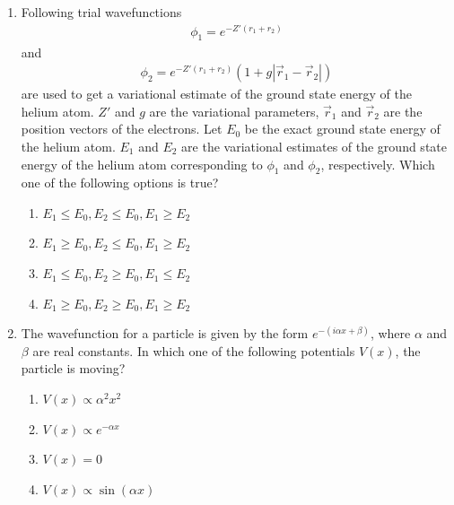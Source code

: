 \documentclass[journal,12pt,onecolumn]{IEEEtran}
\theoremstyle{remark}
\begin{document}
\begin{enumerate}
\item Following trial wavefunctions
\begin{align*}
\phi_1 = e^{-Z'(r_1 + r_2)}
\end{align*}
and
\begin{align*}
    \phi_2 = e^{-Z'(r_1 + r_2)}(1 + g|\vec{r}_1 - \vec{r}_2|)
\end{align*}
are used to get a variational estimate of the ground state energy of the helium atom. $Z'$ and $g$ are the variational parameters, $\vec{r}_1$ and $\vec{r}_2$ are the position vectors of the electrons. Let $E_0$ be the exact ground state energy of the helium atom. $E_1$ and $E_2$ are the variational estimates of the ground state energy of the helium atom corresponding to $\phi_1$ and $\phi_2$, respectively. Which one of the following options is true?
\begin{enumerate}
    \item $E_1 \leq E_0, E_2 \leq E_0, E_1 \geq E_2$
    \item $E_1 \geq E_0, E_2 \leq E_0, E_1 \geq E_2$
    \item $E_1 \leq E_0, E_2 \geq E_0, E_1 \leq E_2$
    \item $E_1 \geq E_0, E_2 \geq E_0, E_1 \geq E_2$
\end{enumerate}
\item The wavefunction for a particle is given by the form $e^{-(i \alpha x + \beta)}$, where $\alpha$ and $\beta$ are real constants. In which one of the following potentials $V(x)$, the particle is moving?
\begin{enumerate}
    \item $V(x) \propto \alpha^2 x^2$
    \item $V(x) \propto e^{-\alpha x}$
    \item $V(x) = 0$
    \item $V(x) \propto \sin(\alpha x)$
\end{enumerate}


\end{enumerate}
\end{document}
